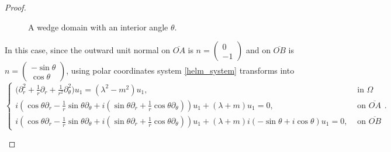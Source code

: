 \begin{proof}
\begin{enumerate}
\begin{figure}[H]
    \caption{A wedge domain with an interior angle \(\theta\).}\label{wedge}
    \end{figure}
    In this case, since the outward unit normal on \(\overline{OA}\) is \(n =\begin{pmatrix}
        0\\
        -1
    \end{pmatrix}\) and on \(\overline{OB}\) is \(n =\begin{pmatrix}
        -\sin \theta\\
        \cos \theta
    \end{pmatrix}\), using polar coordinates system \eqref{helm_system} transforms into
    \begin{equation}\label{helm_polar_wedge}
        \begin{cases}
            \Big(\partial_r^2 + \frac{1}{r}\partial_r +\frac{1}{r^2}\partial_\theta^2 \Big)u_1 = (\lambda^2 - m^2)u_1, & \text{ in } \Omega\\
             i (\cos \theta\partial_r -\frac{1}{r}\sin \theta \partial_\theta + i(\sin \theta\partial_r +\frac{1}{r}\cos \theta \partial_\theta))u_1 + (\lambda + m)u_1 = 0, & \text{ on } \overline{OA}\\
             i (\cos \theta\partial_r -\frac{1}{r}\sin \theta \partial_\theta + i(\sin \theta\partial_r +\frac{1}{r}\cos \theta \partial_\theta))u_1 + (\lambda + m)i(-\sin \theta + i \cos \theta)u_1 = 0, & \text{ on } \overline{OB}
        \end{cases}.      
    \end{equation}


\end{enumerate}
\end{proof}
